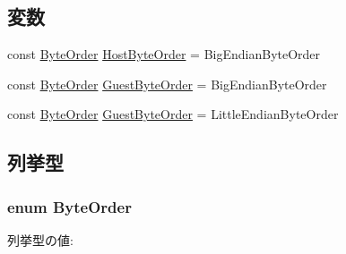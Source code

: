 \subsection*{変数}
\begin{DoxyCompactItemize}
\item 
const \hyperlink{byteswap_8hh_aaeb92d42f5a6e27b8ba19f18d69d142b}{ByteOrder} \hyperlink{byteswap_8hh_aba38c3d743ff1a4568a9aa84a4843326}{HostByteOrder} = BigEndianByteOrder
\item 
const \hyperlink{byteswap_8hh_aaeb92d42f5a6e27b8ba19f18d69d142b}{ByteOrder} \hyperlink{namespaceBigEndianGuest_aef5e34cb4383d2b11025693e07673656}{GuestByteOrder} = BigEndianByteOrder
\item 
const \hyperlink{byteswap_8hh_aaeb92d42f5a6e27b8ba19f18d69d142b}{ByteOrder} \hyperlink{namespaceLittleEndianGuest_aef5e34cb4383d2b11025693e07673656}{GuestByteOrder} = LittleEndianByteOrder
\end{DoxyCompactItemize}


\subsection{列挙型}
\hypertarget{byteswap_8hh_aaeb92d42f5a6e27b8ba19f18d69d142b}{
\subsubsection[{ByteOrder}]{\setlength{\rightskip}{0pt plus 5cm}enum {\bf ByteOrder}}}
\label{byteswap_8hh_aaeb92d42f5a6e27b8ba19f18d69d142b}
\begin{Desc}
\item[列挙型の値: ]\par
\begin{description}
\item[{\em 
\hypertarget{byteswap_8hh_aaeb92d42f5a6e27b8ba19f18d69d142baeb5880acff621b284760d4ed418de2ba}{
BigEndianByteOrder}
\label{byteswap_8hh_aaeb92d42f5a6e27b8ba19f18d69d142baeb5880acff621b284760d4ed418de2ba}
}]\item[{\em 
\hypertarget{byteswap_8hh_aaeb92d42f5a6e27b8ba19f18d69d142ba27cb938a9a54fedfe5c69b927994bbef}{
LittleEndianByteOrder}
\label{byteswap_8hh_aaeb92d42f5a6e27b8ba19f18d69d142ba27cb938a9a54fedfe5c69b927994bbef}
}]\end{description}
\end{Desc}




